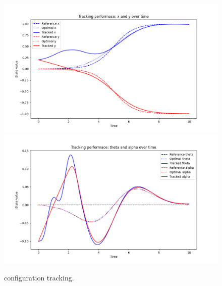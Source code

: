 \begin{figure}[H]
  \centering
  \includegraphics[width=1\textwidth]{pictures/tracking_xy.png}\hfill \\
  \includegraphics[width=1\textwidth]{pictures/tracking_theta_alpha.png}\hfill
  \caption{configuration tracking.}
  \label{fig:Reference trajectory}
\end{figure}

